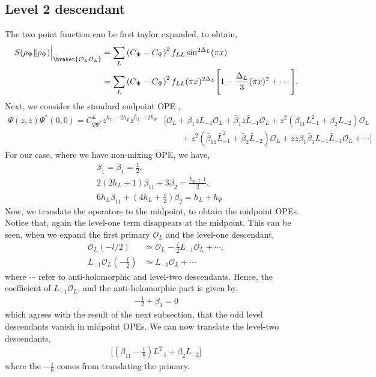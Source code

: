 \documentclass[11pt]{article}
\newcommand{\mO}{\mathcal{O}}
\newcommand{\nn}{\nonumber}
\newcommand{\lb}{\left(}
\newcommand{\rb}{\right)}
\begin{document}
\subsection{Level 2 descendant}
The two point function can be first taylor expanded, to obtain,
\begin{align}
    S(\rho_\Psi \|\rho_\Phi)\Big|_{\braket{\mO_L\mO_L}} &= \sum_L\lb C_\Psi - C_\Phi\rb^2f_{LL}\sin^{2\Delta_L}(\pi x) \\
    &= \sum_L\lb C_\Psi - C_\Phi\rb^2f_{LL}(\pi x)^{2\Delta_L} \Bigg[1 - \frac{\Delta_L}{3}(\pi x)^2 + \cdots \Bigg].
\end{align}
Next, we consider the standard endpoint OPE \cite{yellowbook},
\begin{align}
    \Psi(z,\bar z)  \Psi ^*(0,0) = C_{\Psi \Psi^*}^L z^{h_L - 2h_\Psi}\bar z ^{\bar h_L - 2\bar h_{\Psi}} &\Bigg[ \mO_L + \beta_1 zL_{-1} \mO_L + \bar \beta_1 \bar z \bar L_{-1}\mO_L + z^2 \lb \beta_{11}L_{-1}^2+ \beta_2L_{-2}\rb \mO_L  \nn \\&\qquad + \bar z ^2 \lb \bar \beta_{11}\bar L_{-1}^2 + \bar\beta_2\bar L_{-2}\rb\mO_L + z\bar z \beta_1 \bar \beta_1 L_{-1} \bar L_{-1}\mO_L + \cdots \Bigg]
\end{align}
For our case, where we have non-mixing OPE, we have,
\begin{align}
    &\beta_1 = \bar \beta_1 = \frac{1}{2},\\
    &2(2h_L + 1)\beta_{11} + 3\beta_2 = \frac{h_L+1}{2},\\
    &6h_L \beta_{11}+ \lb 4h_L + \frac{c}{2}\rb \beta_2 = h_L+ h_\Psi 
\end{align}
Now, we translate the operators to the midpoint, to obtain the midpoint OPEs.
Notice that, again the level-one term disappears at the midpoint. This can be seen, when we expand the first primary $\mO_L$ and the level-one descendant,
\begin{align}
    \mO_L\lb - l/2 \rb &\simeq \mO_L - \frac{l}{2}L_{-1}\mO_L + \cdots ,\\
    L_{-1}\mO_L\lb-\frac{l}{2}\rb &\simeq L_{-1}\mO_L + \cdots
\end{align}
where $\cdots$ refer to anti-holomorphic and level-two descendants. Hence, the coefficient of $L_{-1}\mO_L$, and the anti-holomorphic part is given by,
\begin{align}
    -\frac{1}{2} + \beta_1 = 0
\end{align}
which agrees with the result of the next subsection, that the odd level descendants vanish in midpoint OPEs.
We can now translate the level-two descendants,
\begin{align}
    \Bigg[ \lb\beta_{11} - \frac{1}{8}\rb L_{-1}^2 + \beta_2L_{-2} \Bigg]
\end{align}
where the $-\frac{1}{8}$ comes from translating the primary. 
\end{document}
